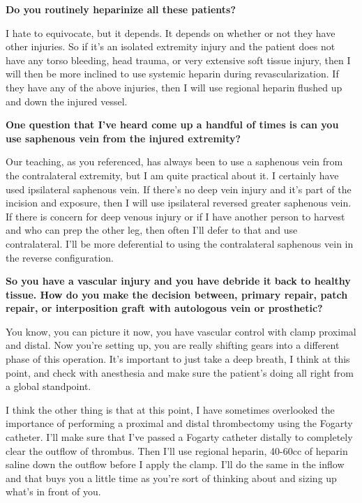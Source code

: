 \documentclass[
]{book}
\begin{document}
\textbf{Do you routinely heparinize all these patients?}

I hate to equivocate, but it depends. It depends on whether or not they
have other injuries. So if it's an isolated extremity injury and the
patient does not have any torso bleeding, head trauma, or very extensive
soft tissue injury, then I will then be more inclined to use systemic
heparin during revascularization. If they have any of the above
injuries, then I will use regional heparin flushed up and down the
injured vessel.\citep{liang2016, fox2012}

\textbf{One question that I've heard come up a handful of times is can you use
saphenous vein from the injured extremity?}

Our teaching, as you referenced, has always been to use a saphenous vein
from the contralateral extremity, but I am quite practical about it. I
certainly have used ipsilateral saphenous vein. If there's no deep vein
injury and it's part of the incision and exposure, then I will use
ipsilateral reversed greater saphenous vein. If there is concern for
deep venous injury or if I have another person to harvest and who can
prep the other leg, then often I'll defer to that and use contralateral.
I'll be more deferential to using the contralateral saphenous vein in
the reverse configuration.\citep{liang2016, fox2012}

\textbf{So you have a vascular injury and you have debride it back to healthy
tissue. How do you make the decision between, primary repair, patch
repair, or interposition graft with autologous vein or prosthetic?}

You know, you can picture it now, you have vascular control with clamp
proximal and distal. Now you're setting up, you are really shifting
gears into a different phase of this operation. It's important to just
take a deep breath, I think at this point, and check with anesthesia and
make sure the patient's doing all right from a global standpoint.

I think the other thing is that at this point, I have sometimes
overlooked the importance of performing a proximal and distal
thrombectomy using the Fogarty catheter. I'll make sure that I've passed
a Fogarty catheter distally to completely clear the outflow of thrombus.
Then I'll use regional heparin, 40-60cc of heparin saline down the
outflow before I apply the clamp. I'll do the same in the inflow and
that buys you a little time as you're sort of thinking about and sizing
up what's in front of you.\citep{liang2016, fox2012}
\end{document}
